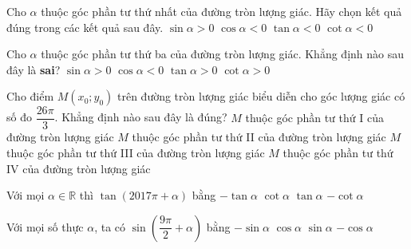 \begin{ex}%
	Cho $\alpha $ thuộc góc phần tư thứ nhất của đường tròn lượng giác. Hãy chọn kết quả đúng trong các kết quả sau đây.
	\choice
	{\True $\sin \alpha >0$}
	{$\cos \alpha <0$}
	{$\tan \alpha <0$}
	{$\cot \alpha <0$}
\end{ex}

\begin{ex}%
	Cho $\alpha $ thuộc góc phần tư thứ ba của đường tròn lượng giác. Khẳng định nào sau đây là\textbf{ sai}?
	\choice
	{\True $\sin \alpha >0$}
	{$\cos \alpha <0$}
	{$\tan \alpha >0$}
	{$\cot \alpha >0$}
\end{ex}

\begin{ex}%
		Cho điểm $M (x_0;y_0)$ trên đường tròn lượng giác biểu diễn cho góc lượng giác có số đo $\dfrac{26 \pi}{3}$. Khẳng định nào sau đây là đúng?
		\choice
		{$M$ thuộc góc phần tư thứ I của đường tròn lượng giác}
		{\True $M$ thuộc góc phần tư thứ II của đường tròn lượng giác}
		{$M$ thuộc góc phần tư thứ III của đường tròn lượng giác}
		{$M$ thuộc góc phần tư thứ IV của đường tròn lượng giác}
\end{ex}

\begin{ex}%
	Với mọi $\alpha \in \mathbb{R}$ thì $\tan \left({2017\pi+\alpha}\right)$ bằng 
	\choice
	{$-\tan \alpha$}
	{$\cot \alpha$}
	{\True $\tan \alpha$}
	{$-\cot \alpha$}
\end{ex}

\begin{ex}%
	Với mọi số thực $\alpha $, ta có $\sin \left({\dfrac{{9\pi}}{2}+\alpha}\right)$ bằng
	\choice
	{$-\sin \alpha$}
	{\True $\cos \alpha$}
	{$\sin \alpha$}
	{$-\cos \alpha$}
\end{ex}


